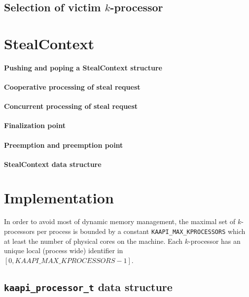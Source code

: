\documentclass{report}
\begin{document}
\subsection{Selection of victim $k$-processor}




\section{StealContext}

\paragraph{Pushing and poping a StealContext structure}

\paragraph{Cooperative processing of steal request}

\paragraph{Concurrent processing of steal request}

\paragraph{Finalization point}

\paragraph{Preemption and preemption point}

\paragraph{StealContext data structure}

\section{Implementation}

In order to avoid most of dynamic memory management, the maximal set of $k$-processors per process is bounded by a constant \verb+KAAPI_MAX_KPROCESSORS+ which at least the number of physical cores on the machine.
Each $k$-processor has an unique local (process wide) identifier in $[0, KAAPI\_MAX\_KPROCESSORS-1]$.

\subsection{\texttt{kaapi\_processor\_t} data structure}
\end{document}
